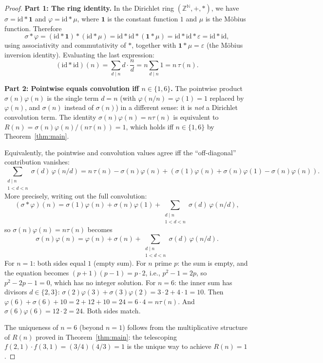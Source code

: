 \documentclass[11pt]{amsart}
\theoremstyle{remark}
\begin{document}
\begin{proof}
\textbf{Part 1: The ring identity.}
In the Dirichlet ring $(\mathbb{Z}^{\mathbb{N}}, +, *)$,
we have $\sigma = \mathrm{id} * \mathbf{1}$ and
$\varphi = \mathrm{id} * \mu$, where $\mathbf{1}$ is the
constant function $1$ and $\mu$ is the M\"obius function.
Therefore
\[
  \sigma * \varphi
  = (\mathrm{id} * \mathbf{1}) * (\mathrm{id} * \mu)
  = \mathrm{id} * \mathrm{id} * (\mathbf{1} * \mu)
  = \mathrm{id} * \mathrm{id} * \varepsilon
  = \mathrm{id} * \mathrm{id},
\]
using associativity and commutativity of $*$, together with
$\mathbf{1} * \mu = \varepsilon$ (the M\"obius inversion identity).
Evaluating the last expression:
\[
  (\mathrm{id} * \mathrm{id})(n)
  = \sum_{d \mid n} d \cdot \frac{n}{d}
  = n \sum_{d \mid n} 1
  = n\,\tau(n).
\]

\textbf{Part 2: Pointwise equals convolution iff $n \in \{1, 6\}$.}
The pointwise product $\sigma(n)\varphi(n)$ is the single term $d = n$
(with $\varphi(n/n) = \varphi(1) = 1$ replaced by $\varphi(n)$, and
$\sigma(n)$ instead of $\sigma(n)$) in a different sense: it is
\emph{not} a Dirichlet convolution term.
The identity $\sigma(n)\varphi(n) = n\tau(n)$ is equivalent to
$R(n) = \sigma(n)\varphi(n)/(n\tau(n)) = 1$,
which holds iff $n \in \{1, 6\}$ by Theorem~\ref{thm:main}.

Equivalently, the pointwise and convolution values agree iff
the ``off-diagonal'' contribution vanishes:
\[
  \sum_{\substack{d \mid n \\ 1 < d < n}} \sigma(d)\,\varphi(n/d)
  = n\,\tau(n) - \sigma(n)\varphi(n) + (\sigma(1)\varphi(n) + \sigma(n)\varphi(1) - \sigma(n)\varphi(n)).
\]
More precisely, writing out the full convolution:
\[
  (\sigma * \varphi)(n) = \sigma(1)\varphi(n) + \sigma(n)\varphi(1)
  + \sum_{\substack{d \mid n \\ 1 < d < n}} \sigma(d)\,\varphi(n/d),
\]
so $\sigma(n)\varphi(n) = n\tau(n)$ becomes
\[
  \sigma(n)\varphi(n) = \varphi(n) + \sigma(n)
  + \sum_{\substack{d \mid n \\ 1 < d < n}} \sigma(d)\,\varphi(n/d).
\]
For $n = 1$: both sides equal $1$ (empty sum).
For $n$ prime $p$: the sum is empty, and the equation becomes
$(p+1)(p-1) = p \cdot 2$, i.e., $p^2 - 1 = 2p$,
so $p^2 - 2p - 1 = 0$, which has no integer solution.
For $n = 6$: the inner sum has divisors $d \in \{2, 3\}$:
$\sigma(2)\varphi(3) + \sigma(3)\varphi(2) = 3 \cdot 2 + 4 \cdot 1 = 10$.
Then $\varphi(6) + \sigma(6) + 10 = 2 + 12 + 10 = 24 = 6 \cdot 4 = n\tau(n)$.
And $\sigma(6)\varphi(6) = 12 \cdot 2 = 24$. Both sides match. \checkmark

The uniqueness of $n = 6$ (beyond $n = 1$) follows from the
multiplicative structure of $R(n)$ proved in Theorem~\ref{thm:main}:
the telescoping $f(2,1) \cdot f(3,1) = (3/4)(4/3) = 1$
is the unique way to achieve $R(n) = 1$.
\end{proof}
\end{document}
